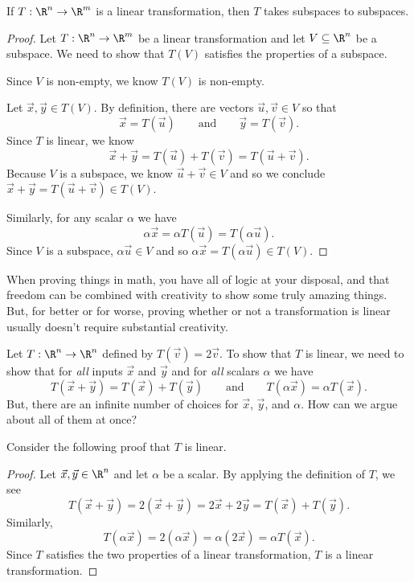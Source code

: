 \begin{theorem}
	If $T:\R^n\to\R^m$ is a linear transformation, then $T$ takes subspaces to subspaces.
\end{theorem}
\begin{proof}
	Let $T:\R^n\to\R^m$ be a linear transformation and let $V\subseteq \R^n$ be a subspace. We need to show
	that $T(V)$ satisfies the properties of a subspace.

	Since $V$ is non-empty, we know $T(V)$ is non-empty.

	Let $\vec x,\vec y\in T(V)$. By definition, there are vectors $\vec u,\vec v\in V$ so that
	\[
		\vec x=T(\vec u)\qquad\text{and}\qquad \vec y=T(\vec v).
	\]
	Since $T$ is linear, we know
	\[
		\vec x+\vec y=T(\vec u)+T(\vec v)=T(\vec u+\vec v).
	\]
	Because $V$ is a subspace, we know $\vec u+\vec v\in V$ and so we conclude $\vec x+\vec y=T(\vec u+\vec v)\in T(V)$.

	Similarly, for any scalar $\alpha$ we have
	\[
		\alpha\vec x=\alpha T(\vec u)=T(\alpha\vec u).
	\]
	Since $V$ is a subspace, $\alpha\vec u\in V$ and so $\alpha\vec x=T(\alpha\vec u)\in T(V)$.
\end{proof}




When proving things in math, you have all of logic at your disposal, and
that freedom can be combined with creativity to show some truly amazing things.
But, for better or for worse, proving whether or not a transformation is linear
usually doesn't require substantial creativity.

Let $T:\R^n\to\R^n$ defined by $T(\vec v)=2\vec v$. To show that $T$ is linear,
we need to show that for \emph{all} inputs $\vec x$ and $\vec y$ and for \emph{all}
scalars $\alpha$ we have
\[
	T(\vec x+\vec y)=T(\vec x)+T(\vec y)\qquad\text{and}\qquad T(\alpha\vec x)=\alpha T(\vec x).
\]
But, there are an infinite number of choices for $\vec x$, $\vec y$, and $\alpha$. How can we argue about all
of them at once?

Consider the following proof that $T$ is linear.
\begin{proof}
	Let $\vec x,\vec y\in \R^n$ and let $\alpha$ be a scalar. By applying the definition
	of $T$, we see
	\[
		T(\vec x+\vec y)=2(\vec x+\vec y)=2\vec x+2\vec y = T(\vec x)+T(\vec y).
	\]
	Similarly,
	\[
		T(\alpha\vec x) = 2(\alpha\vec x)=\alpha(2\vec x)=\alpha T(\vec x).
	\]
	Since $T$ satisfies the two properties of a linear transformation, $T$ is a linear
	transformation.
\end{proof}

